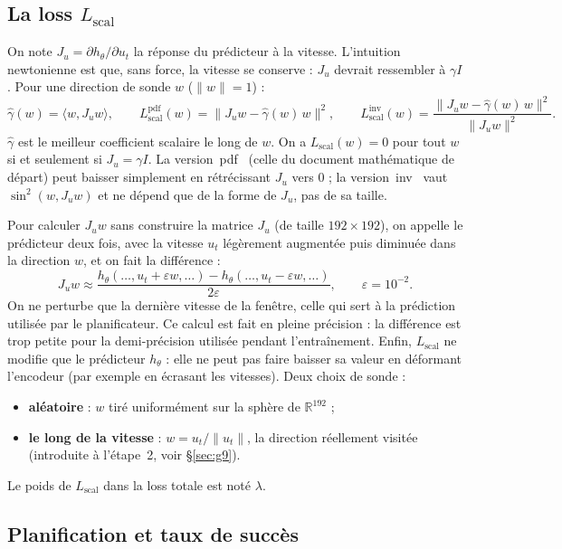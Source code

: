 \documentclass[11pt,a4paper]{article}
\newcommand{\og}{\guillemotleft\,\ignorespaces}
\newcommand{\fg}{\unskip\,\guillemotright}
\newcommand{\Lscal}{L_{\mathrm{scal}}}
\begin{document}
\subsection{La loss $\Lscal$}

On note $J_u = \partial h_\theta / \partial u_t$ la réponse du prédicteur à la vitesse.
L'intuition newtonienne est que, sans force, la vitesse se conserve : $J_u$ devrait
ressembler à $\gamma I$. Pour une direction de sonde $w$ ($\|w\|=1$) :
\[
  \hat\gamma(w) = \langle w, J_u w\rangle,\qquad
  \Lscal^{\mathrm{pdf}}(w) = \|J_u w - \hat\gamma(w)\, w\|^2,\qquad
  \Lscal^{\mathrm{inv}}(w) = \frac{\|J_u w - \hat\gamma(w)\, w\|^2}{\|J_u w\|^2}.
\]
$\hat\gamma$ est le meilleur coefficient scalaire le long de $w$. On a $\Lscal(w) = 0$ pour
tout $w$ si et seulement si $J_u = \gamma I$. La version \og pdf \fg{} (celle du document
mathématique de départ) peut baisser simplement en rétrécissant $J_u$ vers 0 ; la version
\og inv \fg{} vaut $\sin^2(w, J_u w)$ et ne dépend que de la forme de $J_u$, pas de sa taille.

Pour calculer $J_u w$ sans construire la matrice $J_u$ (de taille $192\times192$), on appelle
le prédicteur deux fois, avec la vitesse $u_t$ légèrement augmentée puis diminuée dans la
direction $w$, et on fait la différence :
\[
  J_u w \approx \frac{h_\theta(\ldots, u_t + \varepsilon w, \ldots) - h_\theta(\ldots, u_t - \varepsilon w, \ldots)}{2\varepsilon},
  \qquad \varepsilon = 10^{-2}.
\]
On ne perturbe que la dernière vitesse de la fenêtre, celle qui sert à la prédiction utilisée
par le planificateur. Ce calcul est fait en pleine précision : la différence est trop petite
pour la demi-précision utilisée pendant l'entraînement. Enfin, $\Lscal$ ne modifie que le
prédicteur $h_\theta$ : elle ne peut pas faire baisser sa valeur en déformant l'encodeur (par
exemple en écrasant les vitesses). Deux choix de sonde :
\begin{itemize}
  \item \textbf{aléatoire} : $w$ tiré uniformément sur la sphère de $\mathbb{R}^{192}$ ;
  \item \textbf{le long de la vitesse} : $w = u_t/\|u_t\|$, la direction réellement visitée
  (introduite à l'étape~2, voir \S\ref{sec:g9}).
\end{itemize}
Le poids de $\Lscal$ dans la loss totale est noté $\lambda$.

\subsection{Planification et taux de succès}
\end{document}
